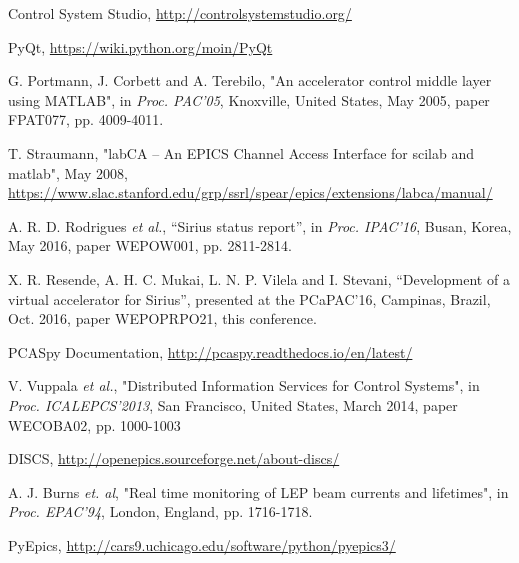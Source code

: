 \documentclass[a4paper,
              ]{jacow}
\begin{document}
\begin{thebibliography}{99}

Control System Studio, \url{http://controlsystemstudio.org/}

PyQt, \url{https://wiki.python.org/moin/PyQt}

G. Portmann, J. Corbett and A. Terebilo,
"An accelerator control middle layer using MATLAB",
in \emph{Proc. PAC'05},
Knoxville, United States, May 2005,
paper FPAT077, pp. 4009-4011.

T. Straumann, "labCA -- An EPICS Channel Access Interface for scilab and matlab",
May 2008, \url{https://www.slac.stanford.edu/grp/ssrl/spear/epics/extensions/labca/manual/}

A. R. D. Rodrigues \emph{et al.},
“Sirius status report”,
in \emph{Proc. IPAC'16},
Busan, Korea, May 2016,
paper WEPOW001, pp. 2811-2814.

X. R. Resende, A. H. C. Mukai, L. N. P. Vilela and I. Stevani,
“Development of a virtual accelerator for Sirius”,
presented at the PCaPAC'16,
Campinas, Brazil, Oct. 2016,
paper WEPOPRPO21, this conference.

PCASpy Documentation, \url{http://pcaspy.readthedocs.io/en/latest/}

V. Vuppala \emph{et al.},
"Distributed Information Services for Control Systems",
in \emph{Proc. ICALEPCS'2013},
San Francisco, United States, March 2014,
paper WECOBA02, pp. 1000-1003

DISCS, \url{http://openepics.sourceforge.net/about-discs/}

A. J. Burns \emph{et. al},
"Real time monitoring of LEP beam currents and lifetimes",
in \emph{Proc. EPAC'94},
London, England, pp. 1716-1718.

PyEpics,  \url{http://cars9.uchicago.edu/software/python/pyepics3/}

\end{thebibliography}
\end{document}
